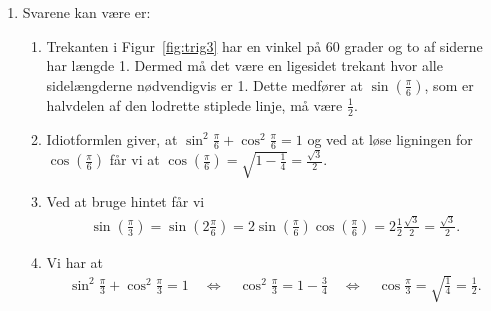 \begin{enumerate}
	\item \label{it:trig3ans} Svarene kan være er:

\begin{enumerate}
	\item Trekanten i Figur~\ref{fig:trig3} har en vinkel på $60$ grader og to af siderne har længde 1. Dermed må det være en ligesidet trekant hvor alle sidelængderne nødvendigvis er 1. Dette medfører at $\sin(\frac{\pi}{6})$, som er halvdelen af den lodrette stiplede linje, må være $\frac{1}{2}$.
	
	\item Idiotformlen giver, at $\sin^2 \frac{\pi}{6}+\cos^2\frac{\pi}{6}=1$ og ved at løse ligningen for $\cos(\frac{\pi}{6})$ får vi at $ \cos(\frac{\pi}{6})=\sqrt{1-\frac{1}{4}}=\frac{\sqrt{3}}{2} $.
	
	\item Ved at bruge hintet får vi
	\begin{align*}
	\sin(\frac{\pi}{3})=\sin(2\frac{\pi}{6}) =2\sin(\frac{\pi}{6})\cos(\frac{\pi}{6})=2\frac{1}{2}\frac{\sqrt{3}}{2}=\frac{\sqrt{3}}{2}.
	\end{align*}
	
	\item Vi har at
	\begin{align*}
	\sin^2 \frac{\pi}{3}+ \cos^2\frac{\pi}{3}=1\quad \Leftrightarrow\quad \cos^2\frac{\pi}{3}=1-\frac{3}{4}\quad \Leftrightarrow\quad \cos\frac{\pi}{3}=\sqrt{\frac{1}{4}}=\frac{1}{2}.
	\end{align*}
	
\end{enumerate}



\end{enumerate}

